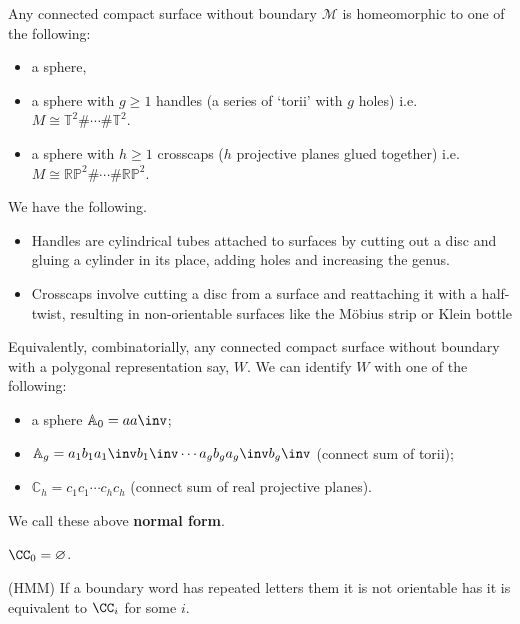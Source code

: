 \documentclass[12pt, a4paper]{article}
\begin{document}
\begin{mdthm}
    Any connected compact surface without boundary \(\mathcal{M}\) is homeomorphic to one of the following:
    \begin{itemize}
        \item a sphere,
        \item a sphere with \(g\geq 1\) handles (a series of `torii' with \(g\) holes) i.e.\ \(M \cong \mathbb{T}^2\#\cdots\#\mathbb{T}^2\).
        \item a sphere with \(h\geq 1\) crosscaps (\(h\) projective planes glued together) i.e.\ \(M \cong \mathbb{RP}^2\#\cdots\#\mathbb{RP}^2\).
    \end{itemize}
\end{mdthm}

\begin{mdnote}
    We have the following.
    \begin{itemize}
        \item Handles are cylindrical tubes attached to surfaces by cutting out a disc and gluing a cylinder in its place, adding holes and increasing the genus.
        \item Crosscaps involve cutting a disc from a surface and reattaching it with a half-twist, resulting in non-orientable surfaces like the Möbius strip or Klein bottle
    \end{itemize}
\end{mdnote}

\begin{mdcor}
    Equivalently, combinatorially, any connected compact surface without boundary with a polygonal representation say, \(W\). We can identify \(W\) with one of the following:
    \begin{itemize}
        \item a sphere \(\mathbb{A}_0=aa\inv\);
        \item \(\mathbb{A}_g=a_1b_1a_1\inv b_1\inv \cdots a_g b_g a_g\inv b_g\inv \) (connect sum of torii);
        \item \(\mathbb{C}_h=c_1c_1\cdots c_hc_h\) (connect sum of real projective planes).
    \end{itemize}
    We call these above \textbf{normal form}.
\end{mdcor}

\begin{mdremark}
    \(\CC_0 =\varnothing\).
\end{mdremark}

\begin{mdnote}
    (HMM) If a boundary word has repeated letters them it is not orientable has it is equivalent to \(\CC_i\) for some \(i\).
\end{mdnote}
\end{document}
